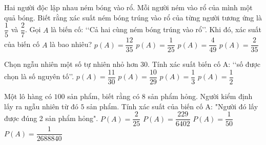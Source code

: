 \begin{ex}
Hai người độc lập nhau ném bóng vào rổ. Mỗi người ném vào rổ của mình một quả bóng. Biết rằng xác suất ném bóng trúng vào rổ của từng người tương ứng là $\dfrac{1}{5}$ và $\dfrac{2}{7}$. Gọi $A$ là biến cố: \lq\lq  Cả hai cùng ném bóng trúng vào rổ\rq\rq . Khi đó, xác suất của biến cố $A$ là bao nhiêu?
\choice
{$p(A)=\dfrac{12}{35}$}
{$p(A)=\dfrac{1}{25}$}
{$p(A)=\dfrac{4}{49}$}
{\True $p(A)=\dfrac{2}{35}$}
\end{ex}
\begin{ex}
Chọn ngẫu nhiên một số tự nhiên nhỏ hơn 30. Tính xác suất biến cố A: \lq\lq  số được chọn là số nguyên tố\rq\rq .
\choice
{$p(A)=\dfrac{11}{30}$}
{$p(A)=\dfrac{10}{29}$}
{\True $p(A)=\dfrac{1}{3}$}
{$p(A)=\dfrac{1}{2}$}
\end{ex}
\begin{ex}
Một lô hàng có $100$ sản phẩm, biết rằng có $8$ sản phẩm hỏng. Người kiểm định lấy ra ngẫu nhiên từ đó $5$ sản phẩm. Tính xác suất của biến cố A: "Người đó lấy được đúng 2 sản phẩm hỏng".
\choice
{$P(A)=\dfrac{2}{25}$}
{\True $P(A)=\dfrac{229}{6402}$}
{$P(A)=\dfrac{1}{50}$}
{$P(A)=\dfrac{1}{2688840}$}
\end{ex}
